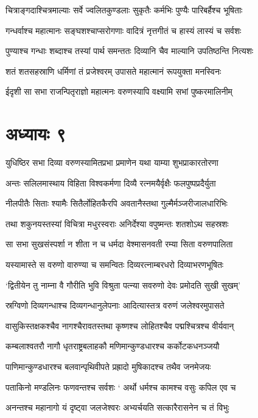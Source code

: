 \twolineshloka
{चित्राङ्गदाश्चित्रमाल्याः सर्वे ज्वलितकुण्डलाः}
{सुकृतैः कर्मभिः पुण्यैः पारिबर्हैश्च भूषिताः}


\twolineshloka
{गन्धर्वाश्च महात्मानः सङ्घशश्चाप्सरोगणाः}
{वादित्रं नृत्तगीतं च हास्यं लास्यं च सर्वशः}


\twolineshloka
{पुण्याश्च गन्धाः शब्दाश्च तस्यां पार्थ समन्ततः}
{दिव्यानि चैव माल्यानि उपतिष्ठन्ति नित्यशः}


\twolineshloka
{शतं शतसहस्राणि धर्मिणां तं प्रजेश्वरम्}
{उपासते महात्मानं रूपयुक्ता मनस्विनः}


\twolineshloka
{ईदृशी सा सभा राजन्पितृराज्ञो महात्मनः}
{वरुणस्यापि वक्ष्यामि सभां पुष्करमालिनीम्}


\chapter{अध्यायः ९}
\twolineshloka
{युधिष्ठिर सभा दिव्या वरुणस्यामितप्रभा}
{प्रमाणेन यथा याम्या शुभप्राकारतोरणा}


\twolineshloka
{अन्तः सलिलमास्थाय विहिता विश्वकर्मणा}
{दिव्यै रत्नमयैर्वृक्षैः फलपुष्पप्रदैर्युता}


\twolineshloka
{नीलपीतैः सिताः श्यामैः सितैर्लोहितकैरपि}
{अवतानैस्तथा गुल्मैर्मञ्जरीजालधारिभिः}


\twolineshloka
{तथा शकुनयस्तस्यां विचित्रा मधुरस्वराः}
{अनिर्देश्या वपुष्मन्तः शतशोऽथ सहस्रशः}


\twolineshloka
{सा सभा सुखसंस्पर्शा न शीता न च धर्मदा}
{वेश्मासनवती रम्या सिता वरुणपालिता}


\twolineshloka
{यस्यामास्ते स वरुणो वारुण्या च समन्वितः}
{दिव्यरत्नाम्बरधरो दिव्याभरणभूषितः}


\twolineshloka
{`द्वितीयेन तु नाम्ना वै गौरीति भुवि विश्रुता}
{पत्न्या सवरुणो देवः प्रमोदति सुखी सुखम्'}


\twolineshloka
{स्रग्विणो दिव्यगन्धाश्च दिव्यगन्धानुलेपनाः}
{आदित्यास्तत्र वरुणं जलेश्वरमुपासते}


\twolineshloka
{वासुकिस्तक्षकश्चैव नागश्चैरावतस्तथा}
{कृष्णश्च लोहितश्चैव पद्मश्चित्रश्च वीर्यवान्}


\twolineshloka
{कम्बलाश्वतरौ नागौ धृतराष्ट्रबलाहकौ}
{मणिमान्कुण्डधारश्च कर्कोटकधनञ्जयौ}


\twolineshloka
{पाणिमान्कुण्डधारश्च बलवान्पृथिवीपते}
{प्रह्रादो मुषिकादश्च तथैव जनमेजयः}


\twolineshloka
{पताकिनो मण्डलिनः फणवन्तश्च सर्वशः}
{` अर्थो धर्मश्च कामश्च वसुः कपिल एव च}


\twolineshloka
{अनन्तश्च महानागो यं दृष्ट्वा जलजेश्वरः}
{अभ्यर्चयति सत्कारैरासनेन च तं विभुः}


